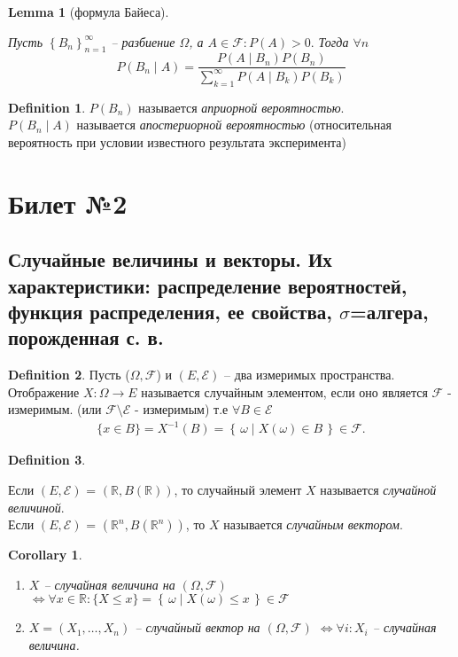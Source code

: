 \documentclass[a4paper]{article}
\theoremstyle{plain}
\newtheorem{lem}{Lemma}
\newtheorem{corollary}{Corollary}
\theoremstyle{remark}
\theoremstyle{definition}
\newtheorem{definition}{Definition}
\newcommand{\setR}{\mathbb{R}}
\newcommand{\setRn}{\mathbb{R}^n}
\newcommand{\setF}{\mathcal{F}}
\newcommand{\braces}[1]{\left\{ #1 \right\}} %
\newcommand{\condset}[2]{\braces{\, #1 \mid #2 \,}} %
\renewcommand{\leq}{\leqslant}
\begin{document}
\begin{lem}[формула Байеса]~

	Пусть $\braces{B_n}_{n = 1}^{\infty}$ -- разбиение $\Omega$, а $A \in \setF : P(A) > 0.$ Тогда $\forall n$
	\begin{equation*}
		P(B_n \mid A) = \frac{P(A \mid B_n) P(B_n)}{\sum_{k = 1}^{\infty} P(A \mid B_k) P(B_k)}
	\end{equation*}
\end{lem}

\begin{definition}
	$P(B_n)$ называется \emph{априорной вероятностью}.\\
	$P(B_n \mid A)$ называется \emph{апостериорной вероятностью} (относительная вероятность при условии известного результата эксперимента)
\end{definition}

\section{Билет №2}
\subsection{Случайные величины и векторы. Их характеристики: распределение вероятностей, функция распределения, ее свойства, $\sigma$=алгера, порожденная с. в.}
\begin{definition}
	Пусть ($\Omega, \setF$) и $(E, \mathcal{E})$ -- два измеримых пространства. 
  Отображение $X\colon \Omega \to E$ называется случайным элементом,
   если оно является $\setF$ - измеримым. (или $\setF \setminus \mathcal{E}$ - измеримым) 
   т.е $\forall B \in \mathcal{E}$
  \begin{align*}
    \{ x \in B \} = X^{-1}(B) = \condset{\omega}{X(\omega) \in B} \in \setF.
  \end{align*}
\end{definition}

\begin{definition}~

  Если $(E, \mathcal{E})$ = $(\setR, B(\setR))$, то случайный элемент $X$ 
  называется \emph{случайной величиной}.\\

  Если $(E, \mathcal{E})$ = $(\setRn, B(\setRn))$, то $X$ называется \emph{случайным вектором}.\\
\end{definition}

\begin{corollary}~

  \begin{enumerate}
    \item 
      $X$ -- случайная величина на $(\Omega, \setF)$
      $\iff \forall x \in \setR :
       \{ X \leq x \} = 
      \condset{\omega}{X(\omega) \leq x} \in \setF$

    \item $X = (X_1, \ldots, X_n)$ -- случайный вектор на $(\Omega, \setF)$
          $\iff \forall i : X_i$ -- случайная величина.
  \end{enumerate}

\end{corollary}
\end{document}

